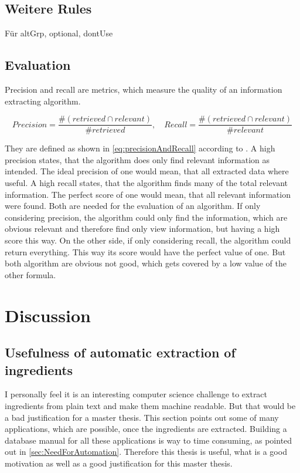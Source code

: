 \documentclass[12pt, twoside]{report}
\begin{document}
\section{Weitere Rules}
Für altGrp, optional, dontUse

\section{Evaluation}
Precision and recall are metrics, which measure the quality of an information extracting algorithm.

\begin{equation} \label{eq:precisionAndRecall}
Precision = \frac{\#(retrieved \cap relevant)}{\#retrieved}, \hspace{1em} Recall = \frac{\#(retrieved \cap relevant)}{\#relevant}
\end{equation}

They are defined as shown in \cref{eq:precisionAndRecall} according to \parencite{surveyOfTextMining}. A high precision states, that the algorithm does only find relevant information as intended. The ideal precision of one would mean, that all extracted data where useful. A high recall states, that the algorithm finds many of the total relevant information. The perfect score of one would mean, that all relevant information were found. Both are needed for the evaluation of an algorithm. If only considering precision, the algorithm could only find the information, which are obvious relevant and therefore find only view information, but having a high score this way. On the other side, if only considering recall, the algorithm could return everything. This way its score would have the perfect value of one. But both algorithm are obvious not good, which gets covered by a low value of the other formula.



\chapter{Discussion}

\section{Usefulness of automatic extraction of ingredients}\label{sec:UsefulnessOfThesis}
I personally feel it is an interesting computer science challenge to extract ingredients from plain text and make them machine readable. But that would be a bad justification for a master thesis. This section points out some of many applications, which are possible, once the ingredients are extracted. Building a database manual for all these applications is way to time consuming, as pointed out in \ref{sec:NeedForAutomation}. Therefore this thesis is useful, what is a good motivation as well as a good justification for this master thesis.
\end{document}
